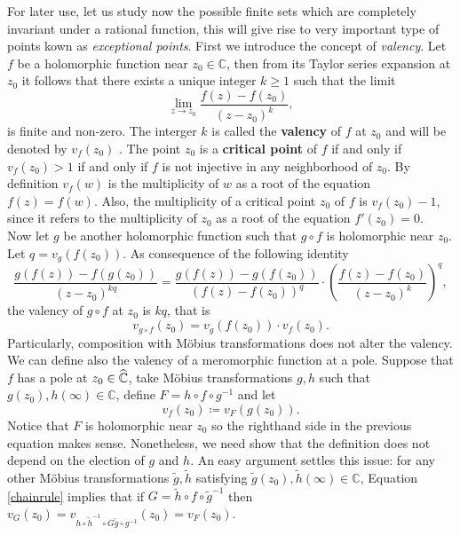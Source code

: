 For later use, let us study now the possible finite sets which are completely invariant under a rational function, this will give rise to very important type of points kown as \emph{exceptional points}. First we introduce the concept of \emph{valency}. Let $f$ be a holomorphic function near $z_0\in \mathbb{C}$, then from its Taylor series expansion at $z_0$ it follows that there exists a unique integer $k\geq 1$ such that the limit
$$\lim_{z\rightarrow z_0} \frac{f(z)-f(z_0)}{(z-z_0)^k},$$
is finite and non-zero. The interger $k$ is called the {\bf valency} of $f$ at $z_0$ and will be denoted by $v_f(z_0)$ . The point $z_0$ is a {\bf critical point} of $f$ if and only if $v_f(z_0)>1$ if and only if $f$ is not injective in any neighborhood of $z_0$. By definition $v_f(w)$ is the multiplicity of $w$ as a root of the equation $f(z)=f(w)$. Also, the multiplicity of a critical point $z_0$ of $f$ is $v_f(z_0)-1$, since it refers to the multiplicity of $z_0$ as a root of the equation $f'(z_0)=0$.\\

Now let $g$ be another holomorphic function such that $g\circ f$ is holomorphic near $z_0$. Let $q=v_g(f(z_0))$. As consequence of the following identity
$$\frac{g(f(z))-f(g(z_0))}{(z-z_0)^{kq}} = \frac{g(f(z))-g(f(z_0))}{(f(z)-f(z_0))^q} \cdot \left( \frac{f(z)-f(z_0)}{(z-z_0)^k}\right)^q,$$
the valency of $g\circ f$ at $z_0$ is $kq$, that is
\begin{equation}\label{chainrule}
v_{g\circ f}(z_0) = v_g(f(z_0))\cdot v_f(z_0).
\end{equation}
Particularly, composition with Möbius transformations does not alter the valency.\\

We can define also the valency of a meromorphic function at a pole. Suppose that $f$ has a pole at $z_0\in \widehat{\mathbb{C}}$, take Möbius transformations $g,h$ such that $g(z_0),h(\infty)\in \mathbb{C}$, define $F=h\circ f\circ g^{-1}$ and let
$$v_f(z_0) \coloneqq v_F(g(z_0)).$$
Notice that $F$ is holomorphic near $z_0$ so the righthand side in the previous equation makes sense. Nonetheless, we need show that the definition does not depend on the election of $g$ and $h$. An easy argument settles this issue: for any other Möbius transformations $\tilde{g},\tilde{h}$ satisfying $\tilde g(z_0),\tilde h(\infty)\in \mathbb{C}$, Equation \eqref{chainrule} implies that if $G=\tilde{h}\circ f \circ \tilde{g}^{-1}$ then $v_G(z_0) = v_{h\circ \tilde{h}^{-1}\circ G \tilde{g}\circ g^{-1}}(z_0)=v_F(z_0)$.\\


